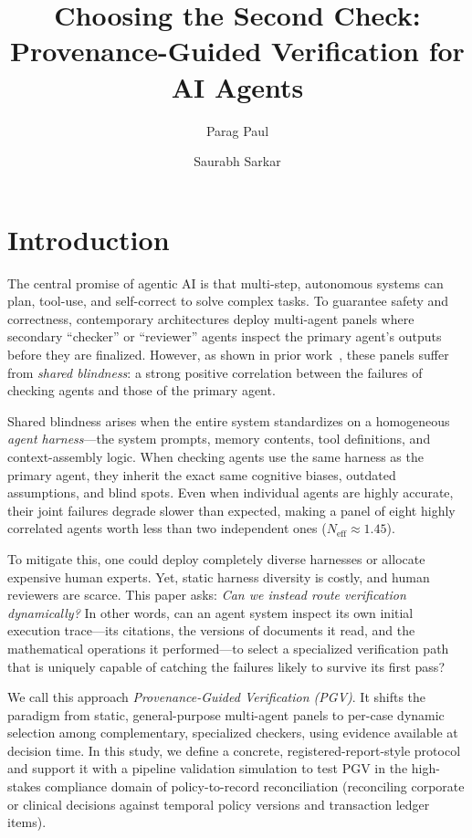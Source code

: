 \documentclass[manuscript,screen,nonacm]{acmart}
\title{Choosing the Second Check: Provenance-Guided Verification for AI Agents}
\author{Parag Paul}
\affiliation{%
  \institution{RigAi / Agentic Memory Foundation}
  \city{Seattle}
  \country{USA}
}
\author{Saurabh Sarkar}
\affiliation{%
  \institution{Chicory AI / Agentic Memory Foundation}
  \city{Seattle}
  \country{USA}
}
\newcommand{\Neff}{N_{\mathrm{eff}}}
\newcommand{\MixNeffKOne}{1.45}
\begin{document}
\maketitle

\section{Introduction}
\label{sec:intro}

The central promise of agentic AI is that multi-step, autonomous systems can plan, tool-use, and self-correct to solve complex tasks. To guarantee safety and correctness, contemporary architectures deploy multi-agent panels where secondary ``checker'' or ``reviewer'' agents inspect the primary agent's outputs before they are finalized. However, as shown in prior work~\cite{paul2026shared}, these panels suffer from \emph{shared blindness}: a strong positive correlation between the failures of checking agents and those of the primary agent. 

Shared blindness arises when the entire system standardizes on a homogeneous \emph{agent harness}—the system prompts, memory contents, tool definitions, and context-assembly logic. When checking agents use the same harness as the primary agent, they inherit the exact same cognitive biases, outdated assumptions, and blind spots. Even when individual agents are highly accurate, their joint failures degrade slower than expected, making a panel of eight highly correlated agents worth less than two independent ones ($\Neff \approx \MixNeffKOne$).

To mitigate this, one could deploy completely diverse harnesses or allocate expensive human experts. Yet, static harness diversity is costly, and human reviewers are scarce. This paper asks: \emph{Can we instead route verification dynamically?} In other words, can an agent system inspect its own initial execution trace—its citations, the versions of documents it read, and the mathematical operations it performed—to select a specialized verification path that is uniquely capable of catching the failures likely to survive its first pass?

We call this approach \emph{Provenance-Guided Verification (PGV)}. It shifts the paradigm from static, general-purpose multi-agent panels to per-case dynamic selection among complementary, specialized checkers, using evidence available at decision time. In this study, we define a concrete, registered-report-style protocol and support it with a pipeline validation simulation to test PGV in the high-stakes compliance domain of policy-to-record reconciliation (reconciling corporate or clinical decisions against temporal policy versions and transaction ledger items).
\end{document}
